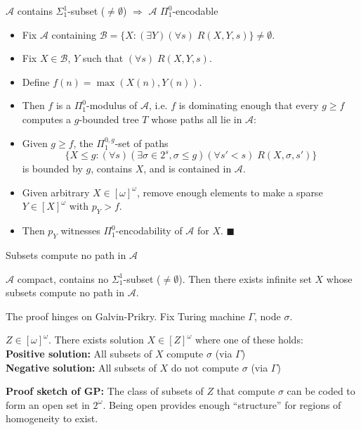 \begin{frame}{$\mathcal{A}$ contains $\Sigma_1^1$-subset ($\neq\emptyset$)
$\Rightarrow$ $\mathcal{A}$ $\Pi_1^0$-encodable}
  \begin{itemize}
    \item Fix $\mathcal{A}$ containing $\mathcal{B} =\{X: (\exists
      Y)(\forall s)\; R(X,Y,s)\} \neq\emptyset$.
    \item Fix $X\in\mathcal{B}$, $Y$ such that $(\forall s)\;R(X,Y,s)$.
    \item Define $f(n)=\max(X(n),Y(n))$.
    \item Then $f$ is a $\Pi_1^0$-modulus of $\mathcal{A}$, i.e. $f$ is
      dominating enough that every $g\geq f$ computes a $g$-bounded tree
      $T$ whose paths all lie in $\mathcal{A}$:
    \item Given $g\geq f$, the $\Pi_1^{0,g}$-set of paths
      \[\{X\leq g:(\forall s)(\exists \sigma\in 2^s, \sigma\leq g)(\forall
      s'<s)\; R(X,\sigma,s')\}\]
      is bounded by $g$, contains $X$, and is contained in $\mathcal{A}$.
    \item Given arbitrary $X\in[\omega]^\omega$, remove enough elements to
      make a sparse $Y\in[X]^\omega$ with $p_Y>f$.
    \item Then $p_Y$ witnesses $\Pi_1^0$-encodability of $\mathcal{A}$ for
      $X$. $\blacksquare$
  \end{itemize}
\end{frame}

\begin{frame}{Subsets compute no path in $\mathcal{A}$}
  \begin{main-thm*}
    $\mathcal{A}$ compact, contains no $\Sigma_1^1$-subset
    ($\neq\emptyset$). Then there exists infinite set $X$ whose subsets
    compute no path in $\mathcal{A}$.
  \end{main-thm*}

  The proof hinges on Galvin-Prikry. Fix Turing machine $\Gamma$, node
  $\sigma$.
  \begin{fact}
    $Z\in[\omega]^\omega$. There exists solution $X\in[Z]^\omega$
    where one of these holds:\\
    \textbf{Positive solution:} All subsets of $X$ compute $\sigma$
    (via $\Gamma$)\\
    \textbf{Negative solution:} All subsets of $X$ do not compute $\sigma$
    (via $\Gamma$)
  \end{fact}
  \textbf{Proof sketch of GP:} The class of subsets of $Z$ that
  compute $\sigma$ can be coded to form an open set in $2^\omega$. Being
  open provides enough ``structure'' for regions of homogeneity to exist.
\end{frame}

